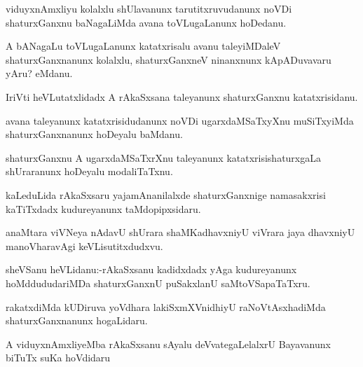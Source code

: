 \documentclass{article}
\begin{document}
\begin{mn}%
viduyxnAmxliyu kolalxlu shUlavanunx tarutitxruvudanunx noVDi shaturxGanxnu baNagaLiMda 
avana toVLugaLanunx hoDedanu.
\end{mn}

\begin{mn}%
A bANagaLu toVLugaLanunx katatxrisalu avanu taleyiMDaleV shaturxGanxnanunx kolalxlu, 
shaturxGanxneV ninanxnunx kApADuvavaru yAru? eMdanu.
\end{mn}

\begin{mn}%
IriVti heVLutatxlidadx A rAkaSxsana taleyanunx shaturxGanxnu katatxrisidanu.
\end{mn}

\begin{mn}%
avana taleyanunx katatxrisidudanunx noVDi ugarxdaMSaTxyXnu muSiTxyiMda shaturxGanxnanunx 
hoDeyalu baMdanu.
\end{mn}

\begin{mn}%
shaturxGanxnu A ugarxdaMSaTxrXnu taleyanunx katatxrisishaturxgaLa shUraranunx hoDeyalu 
modaliTaTxnu.
\end{mn}

\begin{mn}%
kaLeduLida rAkaSxsaru yajamAnanilalxde shaturxGanxnige namasakxrisi kaTiTxdadx kudureyanunx 
taMdopipxsidaru.
\end{mn}

\begin{mn}%
anaMtara viVNeya nAdavU shUrara shaMKadhavxniyU viVrara jaya dhavxniyU manoVharavAgi 
keVLisutitxdudxvu.
\end{mn}


\begin{mn}%
sheVSanu heVLidanu:-rAkaSxsanu kadidxdadx yAga kudureyanunx hoMddududariMDa shaturxGanxnU 
puSakxlanU saMtoVSapaTaTxru. 
\end{mn}

\begin{mn}%
rakatxdiMda kUDiruva yoVdhara lakiSxmXVnidhiyU raNoVtAsxhadiMda shaturxGanxnanunx hogaLidaru.
\end{mn}

\begin{mn}%
A viduyxnAmxliyeMba rAkaSxsanu sAyalu deVvategaLelalxrU Bayavanunx biTuTx suKa hoVdidaru
\end{mn}
\end{document}
